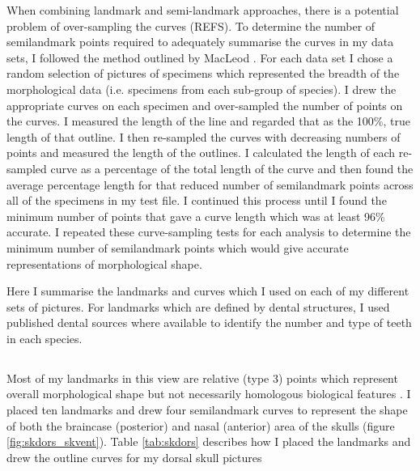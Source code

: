 	When combining landmark and semi-landmark approaches, there is a potential problem of over-sampling the curves (REFS). To determine the number of semilandmark points required to adequately summarise the curves in my data sets,  I followed the method outlined by MacLeod \citeyearpar{MacLeod2012}. For each data set I chose a random selection of pictures of specimens which represented the breadth of the morphological data (i.e. specimens from each sub-group of species). I drew the appropriate curves on each specimen and over-sampled the number of points on the curves. I measured the length of the line and regarded that as the 100\%, true length of that outline. I then re-sampled the curves with decreasing numbers of points and measured the length of the outlines. I calculated the length of each re-sampled curve as a percentage of the total length of the curve and then found the average percentage length for that reduced number of semilandmark points across all of the specimens in my test file. I continued this process until I found the minimum number of points that gave a curve length which was at least 96\% accurate.  I repeated these curve-sampling tests for each analysis to determine the minimum number of semilandmark points which would give accurate representations of morphological shape.
	
	Here I summarise the landmarks and curves which I used on each of my different sets of pictures. For landmarks which are defined by dental structures, I used published dental sources \citep{Repenning1967, Eisenberg1969, Nowak1983, MacPhee1987, KnoxJones1992, Davis1997, Querouil2001, Nagorsen2002, Wilson2005, Goodman2006, Karatas2007, Hoffmann2008, Asher2008, Lin2010,  Muldoon2009, ADW2013} where available to identify the number and type of teeth in each species.
	
\subsection{}
	Most of my landmarks in this view are relative (type 3) points which represent overall morphological shape but not necessarily homologous biological features \citep{Zelditch2012}. I placed ten landmarks and drew four semilandmark curves to represent the shape of both the braincase (posterior) and nasal (anterior) area of the skulls (figure \ref{fig:skdors_skvent}). Table \ref{tab:skdors} describes how I placed the landmarks and drew the outline curves for my dorsal skull pictures 

